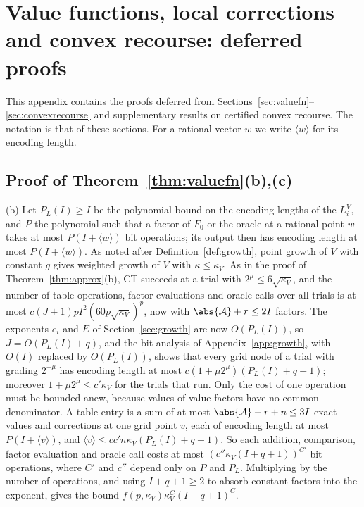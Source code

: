 \section{Value functions, local corrections and convex recourse: deferred
proofs}\label{app:recourse-convex}

This appendix contains the proofs deferred from
Sections~\ref{sec:valuefn}--\ref{sec:convexrecourse} and supplementary
results on certified convex recourse. The notation is that of these
sections. For a rational vector $w$ we write $\langle w\rangle$ for its
encoding length.

\subsection{Proof of Theorem~\ref{thm:valuefn}(b),(c)}

(b) Let $P_L(I)\ge I$ be the polynomial bound on the encoding lengths of
the $L_i^V$, and $P$ the polynomial such that a factor of $F_0$ or the oracle
at a rational point $w$ takes at most $P(I+\langle w\rangle)$ bit operations;
its output then has encoding length at most $P(I+\langle w\rangle)$. As
noted after Definition~\ref{def:growth}, point growth of $V$ with constant
$g$ gives weighted growth of $V$ with $\bar\kappa\le\kappa_V$. As in the
proof of Theorem~\ref{thm:approx}(b), CT succeeds at a trial with
$2^\mu\le6\sqrt{\kappa_V}$, and the number of table operations, factor
evaluations and oracle calls over all trials is at most
$c(J+1)pI^2(60p\sqrt{\kappa_V})^p$, now with $\abs{\mathcal A}+r\le2I$
factors. The exponents $e_i$ and $E$ of Section~\ref{sec:growth} are now
$O(P_L(I))$, so $J=O(P_L(I)+q)$, and the bit analysis of
Appendix~\ref{app:growth}, with $O(I)$ replaced by $O(P_L(I))$, shows that
every grid node of a trial with grading $2^{-\mu}$ has encoding length at
most $c(1+\mu2^\mu)(P_L(I)+q+1)$; moreover $1+\mu2^\mu\le c'\kappa_V$ for
the trials that run. Only the cost of one operation must be bounded anew,
because values of value factors have no common denominator. A table entry
is a sum of at most $\abs{\mathcal A}+r+n\le3I$ exact values and corrections
at one grid point $v$, each of encoding length at most
$P(I+\langle v\rangle)$, and $\langle v\rangle\le
cc'n\kappa_V(P_L(I)+q+1)$. So each addition, comparison, factor evaluation
and oracle call costs at most $(c''\kappa_V(I+q+1))^{C'}$ bit operations,
where $C'$ and $c''$ depend only on $P$ and $P_L$. Multiplying by the
number of operations, and using $I+q+1\ge2$ to absorb constant factors into
the exponent, gives the bound $f(p,\kappa_V)\kappa_V^C(I+q+1)^C$.

